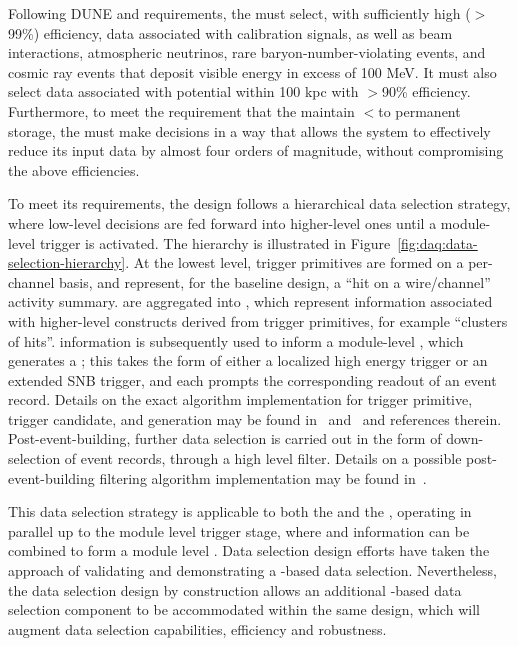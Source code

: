 Following DUNE  and  requirements, the
 must select, with sufficiently high ($>$99\%) efficiency, data associated with calibration
signals, as well as beam interactions,
atmospheric neutrinos, rare baryon-number-violating events, and cosmic
ray events that deposit visible energy in excess of 100 MeV. 
It must also select data associated with potential
 within 100 kpc with $>$90\% efficiency. 
Furthermore, to meet the requirement that the   maintain
$<$\offsitepbpy to permanent storage, the 
must make  decisions in a way that allows the  
system to effectively reduce its input data by almost four orders of magnitude,
without compromising the above efficiencies.

To meet its requirements, the  design follows a hierarchical data selection strategy, where low-level decisions are fed forward into higher-level ones until a module-level trigger is activated. 
The hierarchy is illustrated in
Figure~\ref{fig:daq:data-selection-hierarchy}. 
At the lowest level, trigger primitives are formed on a per-channel basis, and represent, for the baseline design, a ``hit on a wire/channel'' activity summary. 
 are aggregated into , which represent information associated with higher-level constructs derived from trigger primitives, for example ``clusters of hits''. 
 information is subsequently used to inform a
module-level , which generates a ;
this takes the form of either a localized high energy trigger or an
extended SNB trigger, and each prompts the corresponding readout of an
event record. Details on the
exact algorithm implementation for trigger primitive, trigger
candidate, and  generation may be found
in~ and~ and references therein. 
Post-event-building, further data selection is carried out in the form
of down-selection of event records, through a high level
filter. Details on a possible post-event-building filtering algorithm
implementation may be found in~.

This data selection strategy is applicable to both the  and
the , operating in parallel up to the module level trigger stage, where  and  information can be combined to form a module level . 
Data selection design efforts have taken the approach of validating
and demonstrating a -based data selection. Nevertheless,
the data selection design by construction allows an additional
-based data selection component to be accommodated within
the same design, which will augment data selection capabilities, efficiency and robustness.

